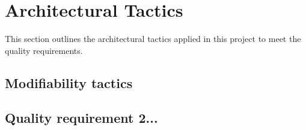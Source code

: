 \section{Architectural Tactics}
This section outlines the architectural tactics applied in this project to meet the quality
requirements.

	\subsection{Modifiability tactics}

	\subsection{Quality requirement 2...}
